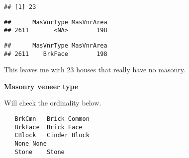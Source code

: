 \documentclass[]{article}
\newenvironment{Shaded}{\begin{snugshade}}{\end{snugshade}}
\newcommand{\CommentTok}[1]{\textcolor[rgb]{0.56,0.35,0.01}{\textit{#1}}}
\newcommand{\DecValTok}[1]{\textcolor[rgb]{0.00,0.00,0.81}{#1}}
\newcommand{\KeywordTok}[1]{\textcolor[rgb]{0.13,0.29,0.53}{\textbf{#1}}}
\newcommand{\NormalTok}[1]{#1}
\newcommand{\OperatorTok}[1]{\textcolor[rgb]{0.81,0.36,0.00}{\textbf{#1}}}
\newcommand{\StringTok}[1]{\textcolor[rgb]{0.31,0.60,0.02}{#1}}
\begin{document}
\begin{verbatim}
## [1] 23
\end{verbatim}

\begin{Shaded}
\end{Shaded}

\begin{verbatim}
##      MasVnrType MasVnrArea
## 2611       <NA>        198
\end{verbatim}

\begin{Shaded}
\end{Shaded}

\begin{verbatim}
##      MasVnrType MasVnrArea
## 2611    BrkFace        198
\end{verbatim}

This leaves me with 23 houses that really have no masonry.

\textbf{Masonry veneer type}

Will check the ordinality below.

\begin{verbatim}
   BrkCmn   Brick Common
   BrkFace  Brick Face
   CBlock   Cinder Block
   None None
   Stone    Stone
\end{verbatim}
\end{document}
